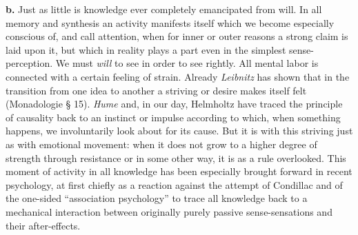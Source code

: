 \documentclass[12pt,a4paper]{book}
\begin{document}
\textbf{b.} Just as little is knowledge ever completely emancipated from
will. In all memory and synthesis an activity manifests itself which we
become especially conscious of, and call attention, when for inner or
outer reasons a strong claim is laid upon it, but which in reality plays
a part even in the simplest sense-perception. We must \emph{will} to see
in order to see rightly. All mental labor is connected with a certain
feeling of strain. Already \emph{Leibnitz} has shown that in the
transition from one idea to another a striving or desire makes itself
felt (Monadologie § 15). \emph{Hume} and, in our day, Helmholtz have
traced the principle of causality back to an instinct or impulse
according to which, when something happens, we involuntarily look about
for its cause. But it is with this striving just as with emotional
movement: when it does not grow to a higher degree of strength through
resistance or in some other way, it is as a rule overlooked. This moment
of activity in all knowledge has been especially brought forward in
recent psychology, at first chiefly as a reaction against the attempt of
Condillac and of the one-sided ``association psychology'' to trace all
knowledge back to a mechanical interaction between originally purely
passive sense-sensations and their after-effects.
\end{document}
